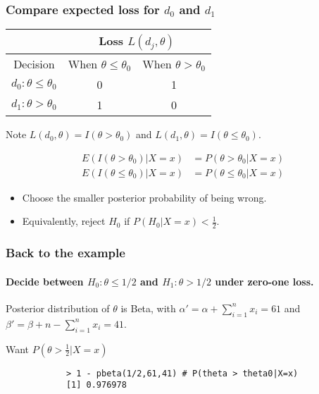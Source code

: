 \documentclass[12pt]{beamer}
\begin{document}
	\begin{frame}
		\frametitle{Compare expected loss for $d_0$ and $d_1$}
		
		\begin{center}
			\begin{tabular}{|c|c|c|}
				\hline
				& \multicolumn{2}{c|}{Loss $L(d_j,\theta)$} \\
				\hline
				Decision & When $\theta \leq \theta_0$ & When $\theta > \theta_0$ \\
				\hline
				$d_0: \theta \leq \theta_0$ & 0 & 1 \\
				\hline
				$d_1: \theta > \theta_0$ & 1 & 0 \\
				\hline
			\end{tabular}
		\end{center}
		
		Note $L(d_0,\theta) = I(\theta > \theta_0)$ and $L(d_1,\theta) = I(\theta \leq \theta_0)$.
		
		\begin{align*}
			E(I(\theta > \theta_0)|X = x) &= P(\theta > \theta_0|X = x) \\
			E(I(\theta \leq \theta_0)|X = x) &= P(\theta \leq \theta_0|X = x)
		\end{align*}
		
		\begin{itemize}[label={\color{blue}$\blacktriangleright$}]
			\item Choose the smaller posterior probability of being wrong.
			\item Equivalently, reject $H_0$ if $P(H_0|X = x) < \frac{1}{2}$.
		\end{itemize}
		
	\end{frame}
	\begin{frame}[fragile]
		\frametitle{Back to the example}
		\framesubtitle{Decide between $H_0 : \theta \leq 1/2$ and $H_1 : \theta > 1/2$ under zero-one loss.}
		
		Posterior distribution of $\theta$ is Beta, with $\alpha' = \alpha + \sum_{i=1}^n x_i = 61$ 
		and $\beta' = \beta + n - \sum_{i=1}^n x_i = 41$.
		
		Want $P(\theta > \frac{1}{2}|X = x)$
		
		\begin{verbatim}
			> 1 - pbeta(1/2,61,41) # P(theta > theta0|X=x)
			[1] 0.976978
		\end{verbatim}
		
	\end{frame}
\end{document}
